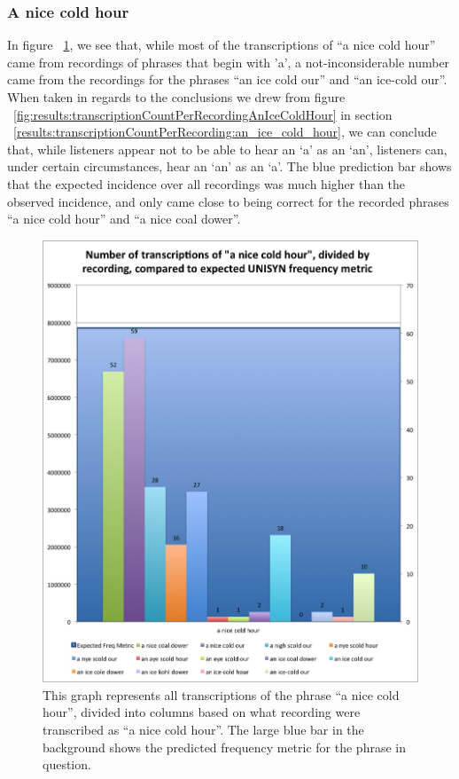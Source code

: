 \subsubsection{A nice cold hour}
\label{results:transcriptionCountPerRecording:a_nice_cold_hour}

In figure ~\ref{fig:results:transcriptionCountPerRecordingANiceColdHour}, we see that, while most of the transcriptions of ``a nice cold hour'' came from recordings of phrases that begin with 'a', a not-inconsiderable number came from the recordings for the phrases ``an ice cold our'' and ``an ice-cold our''. When taken in regards to the conclusions we drew from figure ~\ref{fig:results:transcriptionCountPerRecordingAnIceColdHour} in section ~\ref{results:transcriptionCountPerRecording:an_ice_cold_hour}, we can conclude that, while listeners appear not to be able to hear an `a' as an `an', listeners can, under certain circumstances, hear an `an' as an `a'.  The blue prediction bar shows that the expected incidence over all recordings was much higher than the observed incidence, and only came close to being correct for the recorded phrases ``a nice cold hour'' and ``a nice coal dower''.

\begin{figure}
\includegraphics[width=\textwidth]{TranscriptionCountPerRecording_a_NiceColdHour.jpg}
\captionfonts
\caption[Transcription Count Per Recording for the transcribed phrase ``a nice cold hour'']{ This graph represents all transcriptions of the phrase ``a nice cold hour'', divided into columns based on what recording were transcribed as ``a nice cold hour''. The large blue bar in the background shows the predicted frequency metric for the phrase in question.}
\label{fig:results:transcriptionCountPerRecordingANiceColdHour}
\end{figure}



